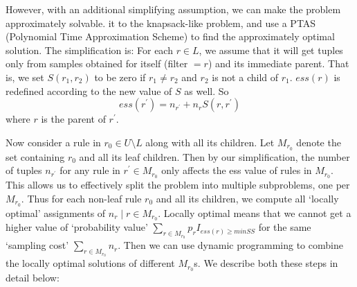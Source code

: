 However, with an additional simplifying assumption, we can make the problem approximately solvable. it to the knapsack-like problem, and use a PTAS (Polynomial Time Approximation Scheme) to find the approximately optimal solution. The simplification is: For each $r \in L$, we assume that it will get tuples only from samples obtained for itself (filter $= r$) and its immediate parent. That is, we set $S(r_1, r_2)$ to be zero if $r_1 \neq r_2$ and $r_2$ is not a child of $r_1$. $ess(r)$ is redefined according to the new value of $S$ as well. So $$ess(r^{\prime}) = n_{r^{\prime}} + n_rS(r, r^{\prime})$$ where $r$ is the parent of $r^{\prime}$.

Now consider a rule in $r_0 \in U \setminus L$ along with all its children. Let $M_{r_0}$ denote the set containing $r_0$ and all its leaf children. Then by our simplification, the number of tuples $n_{r^{\prime}}$ for any rule in $r^{\prime} \in M_{r_0}$ only affects the ess value of rules in $M_{r_0}$. This allows us to effectively split the problem into multiple subproblems, one per $M_{r_0}$. Thus for each non-leaf rule $r_0$ and all its children, we compute all `locally optimal' assignments of $n_r \mid r \in M_{r_0}$. Locally optimal means that we cannot get a higher value of `probability value' $\sum_{r \in M_{r_0}} p_rI_{ess(r) \geq minSS}$ for the same `sampling cost' $\sum_{r\in M_{r_0}} n_r$. Then we can use dynamic programming to combine the locally optimal solutions of different $M_{r_0}$s. We describe both these steps in detail below:

